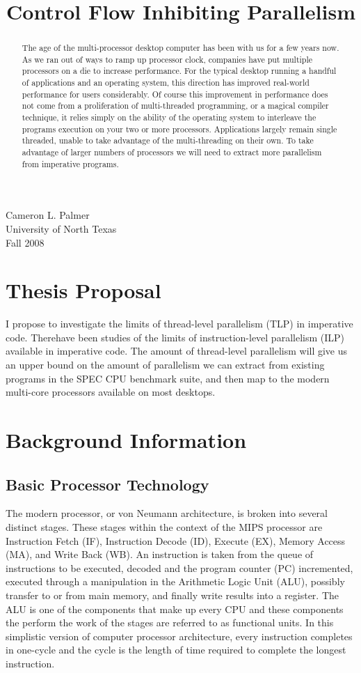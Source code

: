 \documentclass[12pt,twoside,letterpaper]{article}
\begin{document}
Cameron L. Palmer \\
University of North Texas \\
Fall 2008

\title{Control Flow Inhibiting Parallelism}

\begin{abstract}
The age of the multi-processor desktop computer has been with us for a few years now. As we ran out of ways to ramp up processor clock, companies have put multiple processors on a die to increase performance. For the typical desktop running a handful of applications and an operating system, this direction has improved real-world performance for users considerably. Of course this improvement in performance does not come from a proliferation of multi-threaded programming, or a magical compiler technique, it relies simply on the ability of the operating system to interleave the programs execution on your two or more processors. Applications largely remain single threaded, unable to take advantage of the multi-threading on their own. To take advantage of larger numbers of processors we will need to extract more parallelism from imperative programs.
\end{abstract}

\section*{Thesis Proposal}
I propose to investigate the limits of thread-level parallelism (TLP) in imperative code. Therehave been studies of the limits of instruction-level parallelism (ILP) available in imperative code. The amount of thread-level parallelism will give us an upper bound on the amount of parallelism we can extract from existing programs in the SPEC CPU benchmark suite, and then map to the modern multi-core processors available on most desktops.

\section*{Background Information}
\subsection*{Basic Processor Technology}
The modern processor, or von Neumann architecture, is broken into several distinct stages. These stages within the context of the MIPS processor are Instruction Fetch (IF), Instruction Decode (ID), Execute (EX), Memory Access (MA), and Write Back (WB). An instruction is taken from the queue of instructions to be executed, decoded and the program counter (PC) incremented, executed through a manipulation in the Arithmetic Logic Unit (ALU), possibly transfer to or from main memory, and finally write results into a register. The ALU is one of the components that make up every CPU and these components the perform the work of the stages are referred to as functional units. In this simplistic version of computer processor architecture, every instruction completes in one-cycle and the cycle is the length of time required to complete the longest instruction. 
\end{document}
